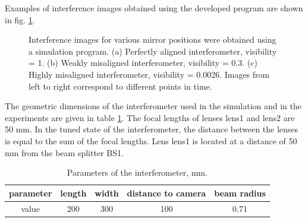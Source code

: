 Examples of interference images obtained using the developed program are shown in fig. \ref{fig:visib_expl}.

\begin{figure}[ht]
    \caption{
    Interference images for various mirror positions were obtained using a simulation program. (a) Perfectly aligned interferometer, visibility = 1. (b) Weakly misaligned interferometer, visibility = 0.3. (c) Highly misaligned interferometer, visibility = 0.0026. Images from left to right correspond to different points in time.}
\label{fig:visib_expl}
\end{figure}

The geometric dimensions of the interferometer used in the simulation and in the experiments are given in table \ref{tab:interf_stat_params}. The focal lengths of lenses lens1 and lens2 are 50 mm. In the tuned state of the interferometer, the distance between the lenses is equal to the sum of the focal lengths. Lens lens1 is located at a distance of 50 mm from the beam splitter BS1.


\begin{table} [htbp]
    \centering
    \begin{threeparttable}%
        \caption{Parameters of the interferometer, mm.}
        \begin{tabular}{|c|c|c|c|c|}
            \hline
            \hline
            parameter   & length & width & distance to camera & beam radius \\
            \hline
            value & 200 & 300 & 100 & 0.71 \\
            \hline
            \hline
        \end{tabular}
        \label{tab:interf_stat_params}
    \end{threeparttable}
\end{table}

